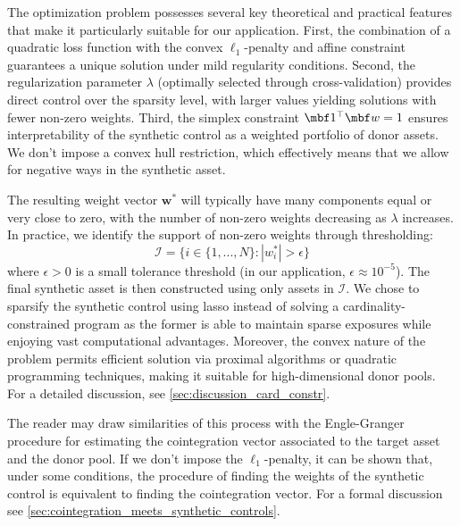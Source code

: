 The optimization problem possesses several key theoretical and practical features that make it particularly suitable for our application. First, the combination of a quadratic loss function with the convex $\ell_1$-penalty and affine constraint guarantees a unique solution under mild regularity conditions. %
Second, the regularization parameter $\lambda$ (optimally selected through cross-validation) provides direct control over the sparsity level, with larger values yielding solutions with fewer non-zero weights. Third, the simplex constraint $\mbf 1^\top \mbf w = 1$ ensures interpretability of the synthetic control as a weighted portfolio of donor assets. We don't impose a convex hull restriction, which effectively means that we allow for negative ways in the synthetic asset.

The resulting weight vector $\mathbf{w}^*$ will typically have many components equal or very close to zero, with the number of non-zero weights decreasing as $\lambda$ increases. In practice, we identify the support of non-zero weights through thresholding:
\begin{equation*}
\mathcal{I} = \{i \in \{1,...,N\} : |w^*_i| > \epsilon\}
\end{equation*}
where $\epsilon > 0$ is a small tolerance threshold (in our application, $\epsilon \approx 10^{-5}$). The final synthetic asset is then constructed using only assets in $\mathcal{I}$. We chose to sparsify the synthetic control using lasso instead of solving a cardinality-constrained program as the former is able to maintain sparse exposures while enjoying vast computational advantages. Moreover, the convex nature of the problem permits efficient solution via proximal algorithms or quadratic programming techniques, making it suitable for high-dimensional donor pools. For a detailed discussion, see \cref{sec:discussion_card_constr}.


The reader may draw similarities of this process with the Engle-Granger procedure for estimating the cointegration vector associated to the target asset and the donor pool. If we don't impose the $\ell_1$-penalty, it can be shown that, under some conditions, the procedure of finding the weights of the synthetic control is equivalent to finding the cointegration vector. For a formal discussion see \cref{sec:cointegration_meets_synthetic_controls}.


